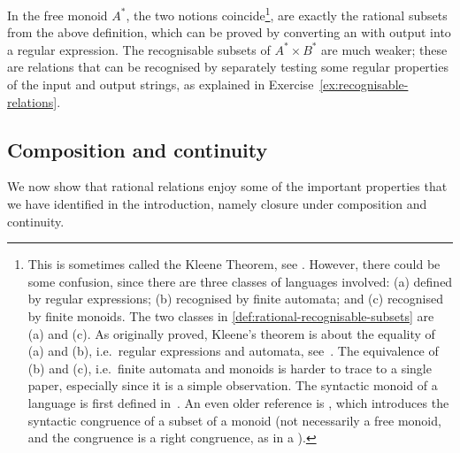 In the free monoid $A^*$, the two notions coincide\footnote{
This is sometimes called the Kleene Theorem, see \cite[Chapter III, Theorem 2.1]{berstel1979}. However, there could be some confusion, since there are three classes of languages involved: (a) defined by regular expressions; (b) recognised by finite automata; and (c) recognised by finite monoids. The two classes in \cref{def:rational-recognisable-subsets} are (a) and (c).    
 As originally proved, Kleene's theorem is about the equality of (a) and (b), i.e.~regular expressions and automata, see~\cite[Theorems 4 and 6]{kleene1951}. The equivalence of (b) and (c), i.e.~finite automata and monoids is harder to trace to a single paper, especially since it is a simple observation. The syntactic monoid of a language is first defined in~\cite[p.~10]{schutzenberger1956}. An even older reference is \cite[Theorem 3]{dubreil1941}, which introduces the syntactic congruence of a subset of a monoid (not necessarily a free monoid, and the congruence is a right congruence, as in a \dfa).}, are exactly the rational subsets from the above definition, which can be proved by converting an \nfa with output into a regular expression. The recognisable subsets of $A^* \times B^*$ are much weaker; these are relations that can be recognised by separately testing some regular properties of the input and output strings, as explained in Exercise~\ref{ex:recognisable-relations}.


\subsection{Composition and continuity} We now show that rational relations enjoy some  of the important properties that we have identified in the introduction, namely closure under composition and continuity.



